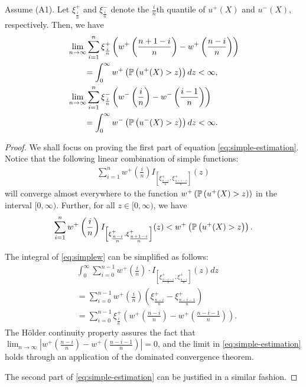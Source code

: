 \begin{proposition}
\label{prop:holder-quantile}
Assume (A1). Let $\xi^+_{\frac{i}{n}}$ and $\xi^-_{\frac{i}{n}}$ denote the $\frac{i}{n}$th quantile of $u^+(X)$ and $u^-(X)$, respectively. Then, we have  
\begin{align}
&\lim_{n \rightarrow \infty} \sum_{i=1}^{n} \xi^+_{\frac{i}{n}} \left(w^+\left(\frac{n+1-i}{n}\right)- w^+\left(\frac{n-i}{n}\right) \right) \nonumber\\
&\qquad= \int_0^{\infty} w^+\left(\mathbb{P}\left( u^+(X)>z \right)\right) dz < \infty,\label{eq:simple-estimation}\\
&\lim_{n \rightarrow \infty} \sum_{i=1}^{n} \xi^-_{\frac{i}{n}} \left(w^-\left(\frac{i}{n}\right)- w^-\left(\frac{i-1}{n}\right) \right) \nonumber\\
&\qquad= \int_0^{\infty} w^-\left(\mathbb{P}\left( u^-(X)>z \right)\right) dz < \infty.\label{eq:simple-estimation2}
\end{align}
\end{proposition}


\begin{proof}
We shall focus on proving the first part of equation \eqref{eq:simple-estimation}. Notice that the following linear combination of simple functions: 
\begin{align}
\sum_{i=1}^{n} w^+ \left(\frac{i}{n}\right) 
I_{\left[\xi^+_\frac{n-i}{n}, \xi^+_\frac{n+1-i}{n}\right]}(z)
\label{eq:simplew}
\end{align}
will converge almost everywhere to the function $w^+\left(\mathbb{P}\left( u^{+}(X)>z \right)\right)$ in the interval $[0, \infty)$. Further, for all $z \in [0,\infty)$, we have
\begin{align*}
\sum_{i=1}^{n} w^+ \left(\frac{i}{n}\right) 
I_{\left[\xi^+_\frac{n-i}{n}, \xi^+_\frac{n+1-i}{n}\right]}(z)
<
w^+\left(\mathbb{P}\left( u^{+}(X)>z \right)\right).
\end{align*}

The integral of \eqref{eq:simplew} can be simplified as follows:
\begin{align*}
& \int_0^{\infty} \sum_{i=0}^{n-1} w^+ \left(\frac{i}{n}\right) 
\cdot I_{\left[\xi^+_\frac{n-i-1}{n}, \xi^+_\frac{n-i}{n}\right]}(z) dz \\
 & = \sum_{i=0}^{n-1} w^+\left(\frac{i}{n}\right) \left(\xi^+_{\frac{n-i}{n}} -
\xi^+_{\frac{n-i-1}{n}}\right) \\ & = \sum_{i=0}^{n-1} \xi^+_{\frac{i}{n}} \left(w^+\left(\frac{n-i}{n}\right)-
    w^+\left(\frac{n-i-1}{n}\right)\right).
\end{align*}
The H\"{o}lder continuity property assures the fact that 
$\lim_{n \rightarrow \infty}  | w^+(\frac{n-i}{n})- w^+(\frac{n-i-1}{n})| =0$, and the limit in \eqref{eq:simple-estimation} holds through an application of the dominated convergence theorem.

The second part of \eqref{eq:simple-estimation} can be justified in a similar fashion.
\end{proof} 

